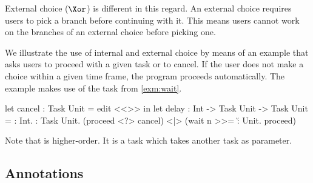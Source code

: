 External choice ($\Xor$) is different in this regard.
An external choice requires users to pick a branch before continuing with it.
This means users cannot work on the branches of an external choice before picking one.


\begin{example}[Delay]
\label{exm:delay}


We illustrate the use of internal and external choice by means of
an example that asks users to proceed with a given task or to cancel.
If the user does not make a choice within a given time frame, the program proceeds automatically.
The example makes use of the task  from \cref{exm:wait}.
\begin{TASK}
  let cancel : Task Unit = edit <<>> in
  let delay : Int -> Task Unit -> Task Unit = \n : Int. \proceed : Task Unit.
    (proceed <?> cancel) <|> (wait n >>= \u : Unit. proceed)
\end{TASK}
Note that  is higher-order.
It is a task which takes another task as parameter.

\end{example}

%

%

\subsection{Annotations}

